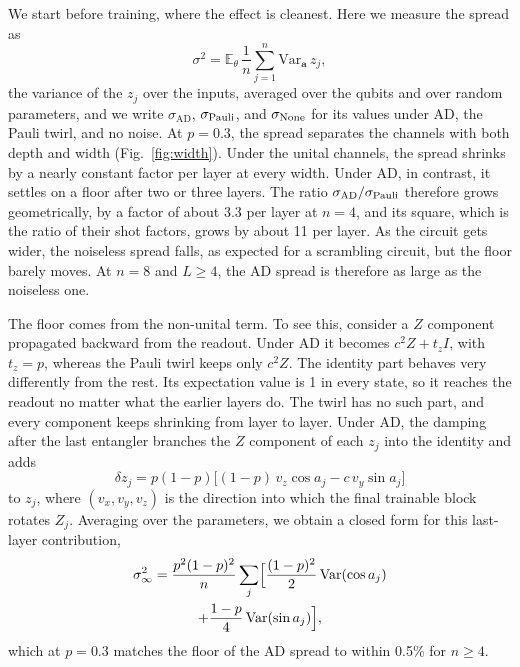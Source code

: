 \documentclass[
 aps,pra,
 twocolumn,
 superscriptaddress,
 longbibliography,
 nofootinbib
]{revtex4-2}
\newcommand{\AD}{\mathrm{AD}}
\begin{document}
We start before training, where the effect is cleanest. Here we measure the
spread as
\begin{equation}
\sigma^2=\mathbb E_\theta\,\frac1n\sum_{j=1}^n\mathrm{Var}_{\mathbf a}\,z_j ,
\label{eq:sigma_rms}
\end{equation}
the variance of the $z_j$ over the inputs, averaged over the qubits and over
random parameters, and we write $\sigma_{\AD}$, $\sigma_{\rm Pauli}$, and
$\sigma_{\rm None}$ for its values under AD, the Pauli twirl, and no noise. At
$p=0.3$, the spread separates the channels with both depth and width
(Fig.~\ref{fig:width}). Under the unital channels, the spread shrinks by a nearly constant factor
per layer at every width. Under AD, in contrast, it settles on a floor after
two or three layers. The ratio $\sigma_{\AD}/\sigma_{\rm Pauli}$ therefore
grows geometrically, by a factor of about 3.3 per layer at $n=4$, and its
square, which is the ratio of their shot factors, grows by about 11 per layer.
As the circuit gets wider,
the noiseless spread falls, as expected for a scrambling circuit, but the floor
barely moves. At $n=8$ and $L\ge4$, the AD spread is therefore as large as
the noiseless one.

The floor comes from the
non-unital term. To see this, consider a $Z$ component propagated backward
from the readout. Under AD it becomes $c^2Z+t_zI$, with $t_z=p$, whereas the
Pauli twirl keeps only $c^2Z$. The identity part behaves very differently from
the rest. Its expectation value is 1 in every state, so it reaches the readout
no matter what the earlier layers do. The twirl has no such part, and every
component keeps shrinking from layer to layer. Under AD, the damping after the last entangler
branches the $Z$ component of each $z_j$ into the identity and adds
\begin{equation}
\delta z_j=p(1-p)\bigl[(1-p)\,v_z\cos a_j-c\,v_y\sin a_j\bigr]
\label{eq:floor}
\end{equation}
to $z_j$, where $(v_x,v_y,v_z)$ is the direction into which the final
trainable block rotates $Z_j$. Averaging over the parameters,
we obtain a closed form for this last-layer
contribution,
\begin{multline}
\sigma_\infty^2=\frac{p^2(1-p)^2}{n}\sum_j\Bigl[\frac{(1-p)^2}{2}\,
\mathrm{Var}(\cos a_j)\\
+\frac{1-p}{4}\,\mathrm{Var}(\sin a_j)\Bigr],
\label{eq:floor_var}
\end{multline}
which at $p=0.3$ matches the floor of the AD spread to within 0.5\% for $n\ge4$.
\end{document}
